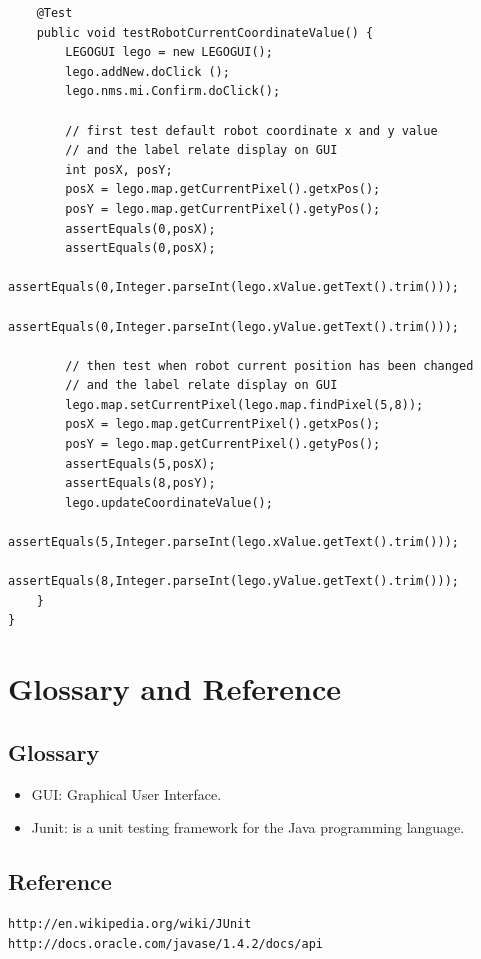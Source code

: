\documentclass[11pt, a4paper]{report}
\begin{document}
\begin{lstlisting}
	@Test
	public void testRobotCurrentCoordinateValue() {
		LEGOGUI lego = new LEGOGUI();
		lego.addNew.doClick ();
		lego.nms.mi.Confirm.doClick();
		
		// first test default robot coordinate x and y value
		// and the label relate display on GUI
		int posX, posY;
		posX = lego.map.getCurrentPixel().getxPos();
		posY = lego.map.getCurrentPixel().getyPos();
		assertEquals(0,posX);
		assertEquals(0,posX);
		assertEquals(0,Integer.parseInt(lego.xValue.getText().trim()));
		assertEquals(0,Integer.parseInt(lego.yValue.getText().trim()));
		
		// then test when robot current position has been changed
		// and the label relate display on GUI
		lego.map.setCurrentPixel(lego.map.findPixel(5,8));
		posX = lego.map.getCurrentPixel().getxPos();
		posY = lego.map.getCurrentPixel().getyPos();
		assertEquals(5,posX);
		assertEquals(8,posY);
		lego.updateCoordinateValue();
		assertEquals(5,Integer.parseInt(lego.xValue.getText().trim()));
		assertEquals(8,Integer.parseInt(lego.yValue.getText().trim()));
	}			
}
\end{lstlisting}
\chapter{Glossary and Reference}
\section{Glossary}
\begin{itemize}
\item GUI: Graphical User Interface.
\item Junit: is a unit testing framework for the Java programming language.
\end{itemize}
\section{Reference}
\begin{lstlisting}
http://en.wikipedia.org/wiki/JUnit
http://docs.oracle.com/javase/1.4.2/docs/api
\end{lstlisting}
\end{document}
